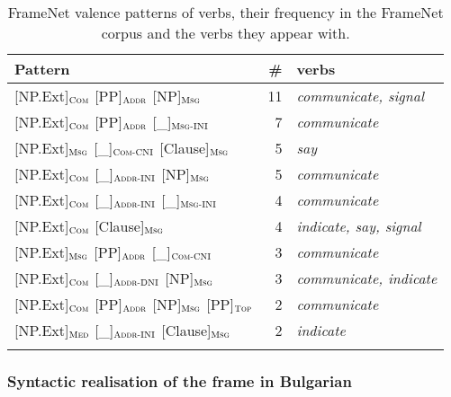\documentclass[output=paper,colorlinks,citecolor=brown]{langscibook}
\begin{document}
\begin{table}
    \begin{tabular}{lrl}
\lsptoprule
         Pattern  & \#  & verbs \\\midrule
{}[NP.Ext]$_{\text{\textsc{Com}}}$ [PP]$_{\text{\textsc{Addr}}}$ [NP]$_{\text{\textsc{Msg}}}$  & 11 & \textit{communicate, signal} \\
{}[NP.Ext]$_{\text{\textsc{Com}}}$ [PP]$_{\text{\textsc{Addr}}}$ {[\_]}$_{\text{\textsc{Msg-INI}}}$  & 7 & \textit{communicate} \\
{}[NP.Ext]$_{\text{\textsc{Msg}}}$ {[\_]}$_{\text{\textsc{Com-CNI}}}$ [Clause]$_{\text{\textsc{Msg}}}$  & 5 & \textit{say} \\
{}[NP.Ext]$_{\text{\textsc{Com}}}$ {[\_]}$_{\text{\textsc{Addr-INI}}}$ [NP]$_{\text{\textsc{Msg}}}$  & 5 & \textit{communicate} \\
{}[NP.Ext]$_{\text{\textsc{Com}}}$ {[\_]}$_{\text{\textsc{Addr-INI}}}$ {[\_]}$_{\text{\textsc{Msg-INI}}}$  & 4 & \textit{communicate} \\
{}[NP.Ext]$_{\text{\textsc{Com}}}$ [Clause]$_{\text{\textsc{Msg}}}$  & 4 & \textit{indicate, say, signal} \\
{}[NP.Ext]$_{\text{\textsc{Msg}}}$ [PP]$_{\text{\textsc{Addr}}}$ {[\_]}$_{\text{\textsc{Com-CNI}}}$  & 3 & \textit{communicate} \\
{}[NP.Ext]$_{\text{\textsc{Com}}}$ {[\_]}$_{\text{\textsc{Addr-DNI}}}$ [NP]$_{\text{\textsc{Msg}}}$  & 3 & \textit{communicate, indicate} \\
{}[NP.Ext]$_{\text{\textsc{Com}}}$ [PP]$_{\text{\textsc{Addr}}}$ [NP]$_{\text{\textsc{Msg}}}$ [PP]$_{\text{\textsc{Top}}}$  & 2 & \textit{communicate} \\
{}[NP.Ext]$_{\text{\textsc{Med}}}$ {[\_]}$_{\text{\textsc{Addr-INI}}}$ [Clause]$_{\text{\textsc{Msg}}}$  & 2 & \textit{indicate} \\
\lspbottomrule
\end{tabular}
    \caption{FrameNet valence patterns of  verbs, their frequency in the FrameNet corpus and the verbs they appear with.}
    \label{tbl:communication-valence}
\end{table} 



\subsubsection{Syntactic realisation of the  frame in Bulgarian}
\end{document}
